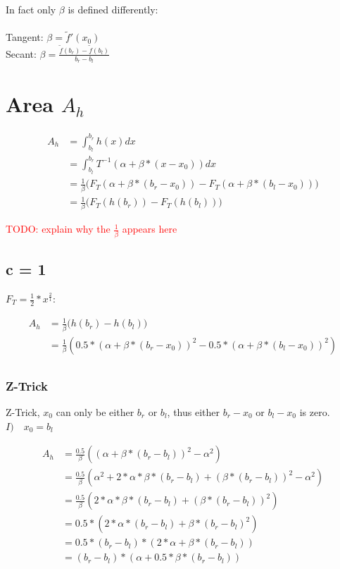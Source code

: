 \documentclass[]{article}
\begin{document}
In fact only $\beta$ is defined differently: \\ 
\ \\
Tangent: $\beta = \tilde{f}'(x_0)$ \\ 
Secant:  $\beta = \frac{\tilde{f}(b_r) - \tilde{f}(b_l)}{b_r - b_l}$


\section{Area $A_h$}

\begin{align*}
A_h &= \int_{b_l}^{b_r} h(x) dx \\
&= \int_{b_l}^{b_r} T^{-1}(\alpha + \beta * (x - x_0)) dx \\
&= \frac{1}{\beta} \big( F_T (\alpha + \beta * (b_r - x_0)) - F_T(\alpha + \beta * (b_l - x_0)) \big) \\
&= \frac{1}{\beta} \big( F_T (h(b_r)) - F_T(h(b_l)) \big)
\end{align*}

\textcolor{red}{TODO: explain why the $\frac{1}{\beta}$ appears here}

\subsection{c = 1}

 $F_T = \frac{1}{2} * x^{\frac{2}{1}}$:

\begin{align*}
A_h &= \frac{1}{\beta} \big(h(b_r) - h(b_l) \big) \\
&= \frac{1}{\beta} \left(0.5 * (\alpha + \beta * (b_r - x_0))^2 - 0.5 * (\alpha + \beta * (b_l - x_0))^2 \right) \\
\end{align*}

\subsubsection{Z-Trick}

Z-Trick, $x_0$ can only be either $b_r$ or $b_l$, thus either $b_r - x_0$ or $b_l - x_0$ is zero. \\

\textbf{$I) \quad x_0 = b_l$}

\begin{align*}
A_h &= \frac{0.5}{\beta} \left( (\alpha + \beta * (b_r - b_l))^2 - \alpha^2  \right) \\
&= \frac{0.5}{\beta} \left( \alpha^2 + 2 * \alpha * \beta * (b_r - b_l) + (\beta * (b_r - b_l))^2 - \alpha^2  \right) \\
&= \frac{0.5}{\beta} \left( 2 * \alpha * \beta * (b_r - b_l) + (\beta * (b_r - b_l))^2 \right) \\
&= 0.5 * \left( 2 * \alpha * (b_r - b_l) + \beta * (b_r - b_l)^2 \right) \\
&= 0.5 * (b_r - b_l) * \left( 2 * \alpha  + \beta * (b_r - b_l) \right) \\
&= (b_r - b_l) * \left(\alpha  + 0.5 * \beta * (b_r - b_l) \right) \\
\end{align*}
\end{document}
